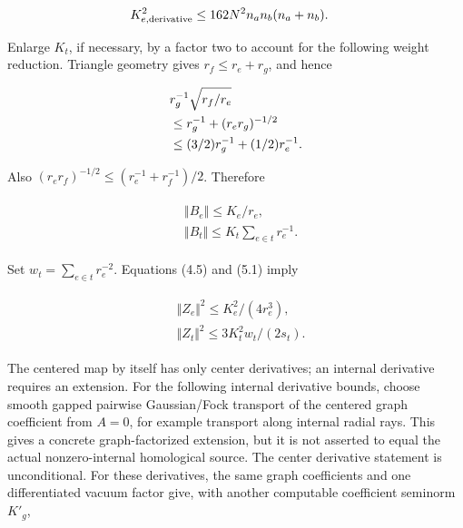 \begin{gather*}
\begin{aligned}
& K_{e,\mathrm{derivative}}^{2} \le  162 N^{2} n_{a} n_{b}(n_{a}+n_{b}).
\end{aligned}\notag
\end{gather*}

Enlarge \(K_{t}\), if necessary, by a factor two to account for the
following weight reduction. Triangle geometry gives
\(r_{f}\le r_{e}+r_{g}\), and hence

\begin{gather*}
\begin{aligned}
& r_{g}^{-1} \sqrt{r_{f}/r_{e}} \\
& \le  r_{g}^{-1} + (r_{e} r_{g})^{-1/2} \\
& \le  (3/2)r_{g}^{-1}+(1/2)r_{e}^{-1}.
\end{aligned}\notag
\end{gather*}

Also \((r_{e} r_{f})^{-1/2} \le  (r_{e}^{-1}+r_{f}^{-1})/2\). Therefore

\begin{gather*}
\begin{aligned}
& \Vert B_{e}\Vert  \le  K_{e}/r_{e}, \\
& \Vert B_{t}\Vert  \le  K_{t} \sum _{e \in  t} r_{e}^{-1}.
\end{aligned}\tag{5.1}
\end{gather*}

Set \(w_{t}=\sum _{e \in  t} r_{e}^{-2}\). Equations (4.5) and (5.1)
imply

\begin{gather*}
\begin{aligned}
& \Vert Z_{e}\Vert ^{2} \le  K_{e}^{2}/(4r_{e}^{3}), \\
& \Vert Z_{t}\Vert ^{2} \le  3 K_{t}^{2} w_{t}/(2s_{t}).
\end{aligned}\tag{5.2}
\end{gather*}

The centered map by itself has only center derivatives; an internal
derivative requires an extension. For the following internal derivative
bounds, choose smooth gapped pairwise Gaussian/Fock transport of the
centered graph coefficient from \(A=0\), for example transport along
internal radial rays. This gives a concrete graph-factorized extension,
but it is not asserted to equal the actual nonzero-internal homological
source. The center derivative statement is unconditional. For these
derivatives, the same graph coefficients and one differentiated vacuum
factor give, with another computable coefficient seminorm \(K'_{g}\),

